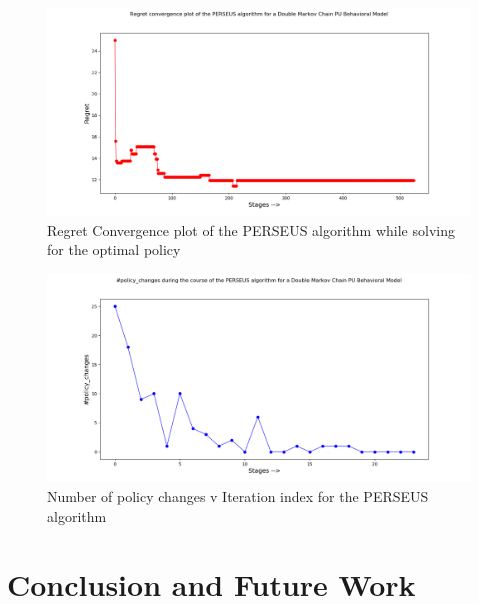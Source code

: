 \documentclass[12pt, draftcls, onecolumn]{IEEEtran}
\begin{document}
\begin{itemize}
\begin{itemize}
\begin{itemize}
\begin{itemize}
        \end{itemize}
    \end{itemize}
    \begin{figure}[t]
        \includegraphics[width=1.0\textwidth]{Regret_Convergence_Plot_04112019.png}
        \caption{Regret Convergence plot of the PERSEUS algorithm while solving for the optimal policy}
        \label{fig:mesh3}
        \centering
    \end{figure}
    \begin{figure}[t]
        \includegraphics[width=1.0\textwidth]{Policy_Changes_Plot_04112019.png}
        \caption{Number of policy changes v Iteration index for the PERSEUS algorithm}
        \label{fig:mesh4}
        \centering
    \end{figure}
\end{itemize}
\end{itemize}
\clearpage
\section{Conclusion and Future Work}
\end{document}
